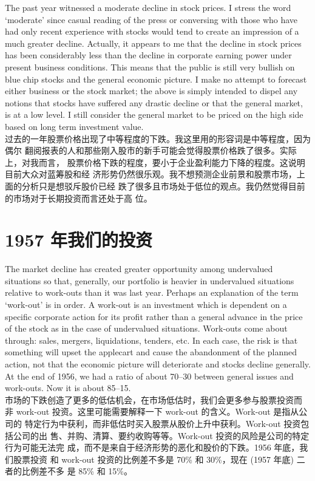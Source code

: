 \begin{verseparallel}
  {
    The past year witnessed a moderate decline in stock prices. I stress the
    word `moderate' since casual reading of the press or conversing with those
    who have had only recent experience with stocks would tend to create an
    impression of a much greater decline. Actually, it appears to me that the
    decline in stock prices has been considerably less than the decline in
    corporate earning power under present business conditions. This means that
    the public is still very bullish on blue chip stocks and the general
    economic picture. I make no attempt to forecast either business or the stock
    market; the above is simply intended to dispel any notions that stocks have
    suffered any drastic decline or that the general market, is at a low level.
    I still consider the general market to be priced on the high side based on
    long term investment value. \\
  }
  {
    过去的一年股票价格出现了中等程度的下跌。我这里用的形容词是中等程度，因为偶尔
    翻阅报表的人和那些刚入股市的新手可能会觉得股票价格跌了很多。实际上，对我而言，
    股票价格下跌的程度，要小于企业盈利能力下降的程度。这说明目前大众对蓝筹股和经
    济形势仍然很乐观。我不想预测企业前景和股票市场，上面的分析只是想驳斥股价已经
    跌了很多且市场处于低位的观点。我仍然觉得目前的市场对于长期投资而言还处于高
    位。
  }
\end{verseparallel}

\section{1957 年我们的投资}

\begin{verseparallel}
  {
    The market decline has created greater opportunity among undervalued
    situations so that, generally, our portfolio is heavier in undervalued
    situations relative to work-outs than it was last year. Perhaps an
    explanation of the term `work-out' is in order. A work-out is an investment
    which is dependent on a specific corporate action for its profit rather than
    a general advance in the price of the stock as in the case of undervalued
    situations. Work-outs come about through: sales, mergers, liquidations,
    tenders, etc. In each case, the risk is that something will upset the
    applecart and cause the abandonment of the planned action, not that the
    economic picture will deteriorate and stocks decline generally. At the end
    of 1956, we had a ratio of about 70--30 between general issues and work-outs.
    Now it is about 85--15. \\
  }
  {
    市场的下跌创造了更多的低估机会，在市场低估时，我们会更多参与股票投资而
    非 work-out 投资。这里可能需要解释一下 work-out 的含义。Work-out 是指从公司的
    特定行为中获利，而非低估时买入股票从股价上升中获利。Work-out 投资包括公司的出
    售、并购、清算、要约收购等等。Work-out 投资的风险是公司的特定行为可能无法完
    成，而不是来自于经济形势的恶化和股价的下跌。1956 年底，我们股票投资
    和 work-out 投资的比例差不多是 70\% 和 30\%，现在 (1957 年底) 二者的比例差不多
    是 85\% 和 15\%。
  }
\end{verseparallel}

